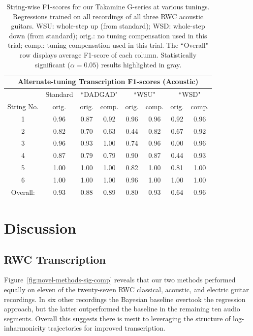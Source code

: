 \documentclass[convention,peer-reviewed]{aesconf}
\begin{document}
\begin{table}[!htbp]
\begin{center}
\begin{tabular}{||c||c||c|c||c|c||c|c||}
\hline
\multicolumn{8}{|c|}{\bf{Alternate-tuning Transcription F1-scores (Acoustic)}} \\
\hline
& Standard & \multicolumn{2}{|c|}{``DADGAD"} & \multicolumn{2}{|c|}{``WSU"} & \multicolumn{2}{|c|}{``WSD"} \\
\hline
String No. & orig. & orig. & comp. & orig. & comp. & orig. & comp. \\
\hline
1 & 0.96 & 0.87 & 0.92 & 0.96 & 0.96 & 0.92 & 0.96 \\
\hline
2 & 0.82 & 0.70 & 0.63 & 0.44 & 0.82 & 0.67 & 0.92\\
\hline
3 & 0.96 & 0.93 & 1.00 & 0.74 & 0.96 & 0.00 & 0.96\\
\hline
4 & 0.87 & 0.79 & 0.79 & 0.90 & 0.87 & 0.44 & 0.93 \\
\hline
5 & 1.00 & 1.00 & 1.00 & 0.82 & 1.00 & 0.81 & 1.00 \\
\hline
6 & 1.00 & 1.00 & 1.00 & 0.96 & 1.00 & 1.00 & 1.00\\ 
\hline
\hline
Overall: & 0.93 & 0.88 & 0.89 & \cellcolor[gray]{0.8}0.80 & \cellcolor[gray]{0.8}0.93 & \cellcolor[gray]{0.8}0.64 & \cellcolor[gray]{0.8}0.96\\
\hline
\end{tabular}
\caption{String-wise F1-scores for our Takamine G-series at various tunings. Regressions trained on all recordings of all three RWC acoustic guitars. WSU: whole-step up (from standard); WSD: whole-step down (from standard); orig.: no tuning compensation used in this trial; comp.: tuning compensation used in this trial. The ``Overall" row displays average F1-score of each column. Statistically significant ($\alpha=0.05$) results highlighted in gray.} 
\label{tab:results-ag-tune}
\end{center}
\end{table}


\section{Discussion} 
\subsection{RWC Transcription}
Figure~\ref{fig:novel-methods-sig-comp} reveals that our two methods performed equally on eleven of the twenty-seven RWC classical, acoustic, and electric guitar recordings. In six other recordings the Bayesian baseline overtook the regression approach, but the latter outperformed the baseline in the remaining ten audio segments. Overall this suggests there is merit to leveraging the structure of log-inharmonicity trajectories for improved transcription.
\end{document}

